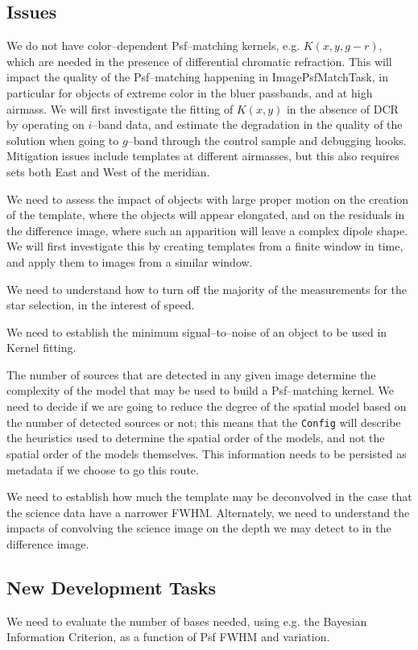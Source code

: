 \documentclass[12pt]{article}
\begin{document}
\subsection{Issues}
We do not have color--dependent Psf--matching kernels,
e.g. $K(x,y,g-r)$, which are needed in the presence of differential
chromatic refraction.  This will impact the quality of the
Psf--matching happening in ImagePsfMatchTask, in particular for
objects of extreme color in the bluer passbands, and at high airmass.
We will first investigate the fitting of $K(x,y)$ in the absence of
DCR by operating on $i$--band data, and estimate the degradation in
the quality of the solution when going to $g$--band through the
control sample and debugging hooks.  Mitigation issues include
templates at different airmasses, but this also requires sets both East
and West of the meridian.

We need to assess the impact of objects with large proper motion on
the creation of the template, where the objects will appear elongated,
and on the residuals in the difference image, where such an apparition
will leave a complex dipole shape.  We will first investigate this by
creating templates from a finite window in time, and apply them to
images from a similar window.

We need to understand how to turn off the majority of the measurements
for the star selection, in the interest of speed.

We need to establish the minimum signal--to--noise of an object to be
used in Kernel fitting.

The number of sources that are detected in any given image determine
the complexity of the model that may be used to build a Psf--matching
kernel.  We need to decide if we are going to reduce the degree of the
spatial model based on the number of detected sources or not; this
means that the {\tt Config} will describe the heuristics used to
determine the spatial order of the models, and not the spatial order
of the models themselves.  This information needs to be persisted as
metadata if we choose to go this route.

We need to establish how much the template may be deconvolved in the
case that the science data have a narrower FWHM.  Alternately, we need
to understand the impacts of convolving the science image on the depth
we may detect to in the difference image.

\subsection{New Development Tasks}
We need to evaluate the number of bases needed, using e.g. the
Bayesian Information Criterion, as a function of Psf FWHM and
variation.
\end{document}
